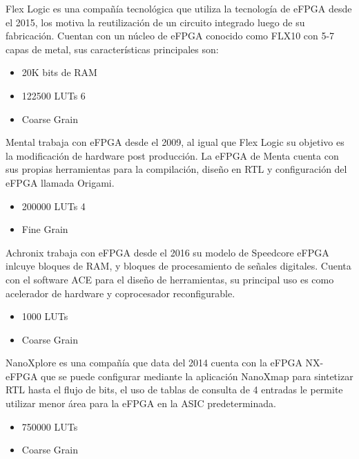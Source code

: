 Flex Logic es una compañía tecnológica que utiliza la tecnología de eFPGA desde el 2015,
los motiva la reutilización de un circuito integrado luego de su fabricación. Cuentan con
un núcleo de eFPGA conocido como FLX10 con 5-7 capas de metal, sus características
principales son:

\begin{itemize}

    \item 20K bits de RAM
    \item 122500 LUTs 6
    \item Coarse Grain
    
\end{itemize}

Mental trabaja con eFPGA desde el 2009, al igual que Flex Logic su objetivo es la
modificación de hardware post producción. La eFPGA de Menta cuenta con sus propias
herramientas para la compilación, diseño en RTL y configuración del eFPGA llamada
Origami.\cite{saidi2018survey}

\begin{itemize}

    \item 200000 LUTs 4
    \item Fine Grain
    
\end{itemize}

Achronix trabaja con eFPGA desde el 2016 su modelo de Speedcore eFPGA inlcuye
bloques de RAM, y bloques de procesamiento de señales digitales. Cuenta con el software
ACE para el diseño de herramientas, su principal uso es como acelerador de hardware y
coprocesador reconfigurable.\cite{saidi2018survey}

\begin{itemize}

    \item 1000 LUTs
    \item Coarse Grain
    
\end{itemize}

NanoXplore es una compañía que data del 2014 cuenta con la eFPGA NX-eFPGA que
se puede configurar mediante la aplicación NanoXmap para sintetizar RTL hasta el flujo
de bits, el uso de tablas de consulta de 4 entradas le permite utilizar menor área para la
eFPGA en la ASIC predeterminada.\cite{saidi2018survey}

\begin{itemize}

    \item 750000 LUTs
    \item Coarse Grain
    
\end{itemize}


